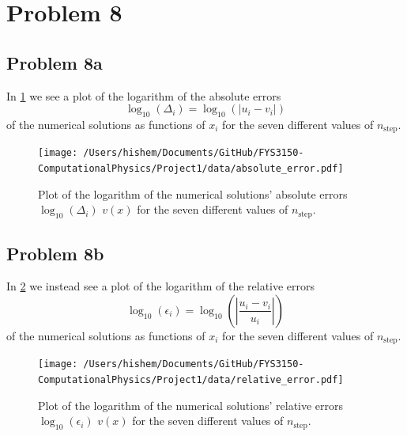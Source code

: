 \documentclass[english,notitlepage]{revtex4-1}  %
\begin{document}
\section*{Problem 8}
\subsection*{Problem 8a}
In \cref*{abs err} we see a plot of the logarithm of the absolute errors 
\begin{equation}
    \log_{10}(\Delta_i) = \log_{10}(|u_i - v_i|)
\end{equation}
of the numerical solutions as functions of $x_i$ for the seven different values of $n_\text{step}$.

\begin{figure}[h!]
    \centering 
    \texttt{[image: /Users/hishem/Documents/GitHub/FYS3150-ComputationalPhysics/Project1/data/absolute\_error.pdf]} %
    \caption{Plot of the logarithm of the numerical solutions' absolute errors $\log_{10}(\Delta_i)$ $v(x)$ for the seven different values of $n_\text{step}$.}
    \label{abs err}
\end{figure}

\subsection*{Problem 8b}
In \cref{rel err} we instead see a plot of the logarithm of the relative errors 
\begin{equation}
    \log_{10}(\epsilon_i) = \log_{10}\left(\left|\frac{u_i - v_i}{u_i}\right|\right)
\end{equation}
of the numerical solutions as functions of $x_i$ for the seven different values of $n_\text{step}$.

\begin{figure}[h!]
    \centering 
    \texttt{[image: /Users/hishem/Documents/GitHub/FYS3150-ComputationalPhysics/Project1/data/relative\_error.pdf]} %
    \caption{Plot of the logarithm of the numerical solutions' relative errors $\log_{10}(\epsilon_i)$ $v(x)$ for the seven different values of $n_\text{step}$.}
    \label{rel err}
\end{figure}
\end{document}
